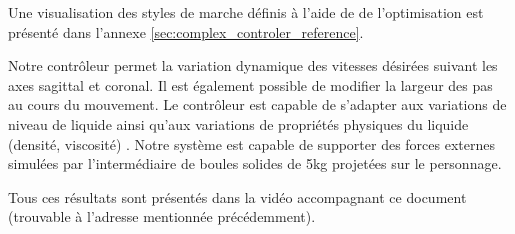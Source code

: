 \documentclass[runningheads,a4paper]{llncs}
\begin{document}
Une visualisation des styles de marche définis à l'aide de de l'optimisation est présenté dans l'annexe \ref{sec:complex_controler_reference}. 

Notre contrôleur permet la variation dynamique des vitesses désirées suivant les axes sagittal et coronal. Il est également possible de modifier la largeur des pas au cours du mouvement.
Le contrôleur est capable de s'adapter aux variations de niveau de liquide ainsi qu'aux variations de propriétés physiques du liquide (densité, viscosité) . Notre système est capable de supporter des forces externes simulées par l'intermédiaire de boules solides de 5kg projetées sur le personnage.

Tous ces résultats sont présentés dans la vidéo accompagnant ce document (trouvable à l'adresse mentionnée précédemment).
\end{document}
